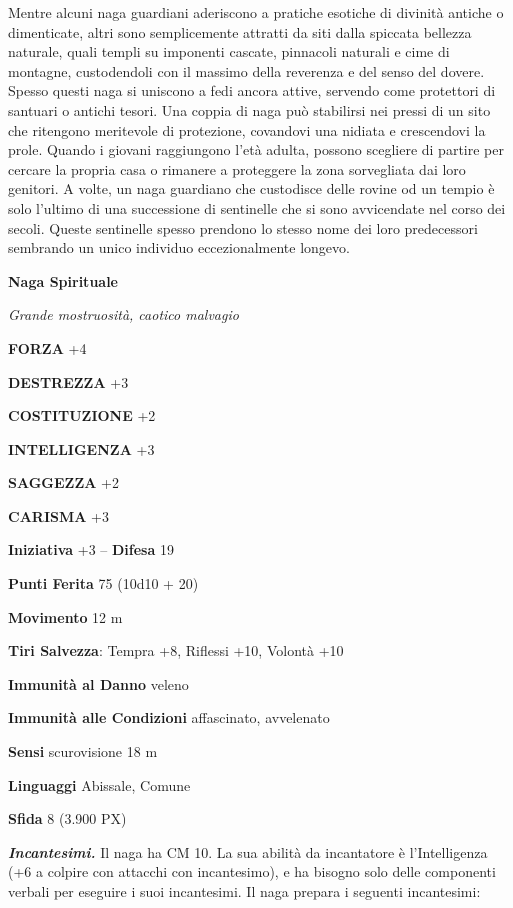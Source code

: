 \begin{multicols}{2}
	Mentre alcuni naga guardiani aderiscono a pratiche esotiche di divinità antiche o dimenticate, altri sono semplicemente attratti da siti dalla spiccata bellezza naturale, quali templi su imponenti cascate, pinnacoli naturali e cime di montagne, custodendoli con il massimo della reverenza e del senso del dovere. Spesso questi naga si uniscono a fedi ancora attive, servendo come protettori di santuari o antichi tesori. Una coppia di naga può stabilirsi nei pressi di un sito che ritengono meritevole di protezione, covandovi una nidiata e crescendovi la prole. Quando i giovani raggiungono l'età adulta, possono scegliere di partire per cercare la propria casa o rimanere a proteggere la zona sorvegliata dai loro genitori. A volte, un naga guardiano che custodisce delle rovine od un tempio è solo l'ultimo di una successione di sentinelle che si sono avvicendate nel corso dei secoli. Queste sentinelle spesso prendono lo stesso nome dei loro predecessori sembrando un unico individuo eccezionalmente longevo.


	\medskip{}\textbf{Naga Spirituale}

	\textit{Grande mostruosità, caotico malvagio}

	\textbf{FORZA} +4

	\textbf{DESTREZZA} +3

	\textbf{COSTITUZIONE} +2

	\textbf{INTELLIGENZA} +3

	\textbf{SAGGEZZA} +2

	\textbf{CARISMA} +3

	\textbf{Iniziativa} +3 -- \textbf{Difesa} 19

	\textbf{Punti Ferita} 75 (10d10 + 20)

	\textbf{Movimento} 12 m

	\textbf{Tiri Salvezza}: Tempra +8, Riflessi +10, Volontà +10

	\textbf{Immunità al Danno} veleno

	\textbf{Immunità alle Condizioni} affascinato, avvelenato

	\textbf{Sensi} scurovisione 18 m

	\textbf{Linguaggi} Abissale, Comune

	\textbf{Sfida} 8 (3.900 PX)

	\textit{\textbf{Incantesimi.}} Il naga ha CM 10. La sua abilità da incantatore è l'Intelligenza (+6 a colpire con attacchi con incantesimo), e ha bisogno solo delle componenti verbali per eseguire i suoi incantesimi. Il naga prepara i seguenti incantesimi:


\end{multicols}
